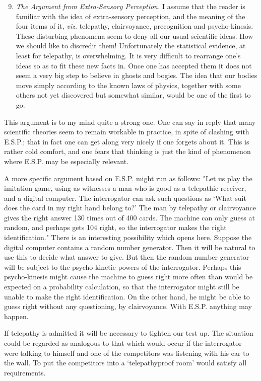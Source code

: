     \begin{enumerate}[label=(\arabic*)]
        \setcounter{enumi}{8}
        \item{\textit{The Argument from Extra-Sensory Perception.} I assume that the reader is familiar with the idea of extra-sensory perception, and the meaning of the four items of it, \textit{viz.} telepathy, clairvoyance, precognition and psycho-kinesis. These disturbing phenomena seem to deny all our usual scientific ideas. How we should like to discredit them! Unfortunately the statistical evidence, at least for telepathy, is overwhelming. It is very difficult to rearrange one's ideas so as to fit these new facts in. Once one has accepted them it does not seem a very big step to believe in ghosts and bogies. The idea that our bodies move simply according to the known laws of physics, together with some others not yet discovered but somewhat similar, would be one of the first to go.}
    \end{enumerate}

    This argument is to my mind quite a strong one. One can say in reply that many scientific theories seem to remain workable in practice, in spite of clashing with E.S.P.; that in fact one can get along very nicely if one forgets about it. This is rather cold comfort, and one fears that thinking is just the kind of phenomenon where E.S.P. may be especially relevant.
    
    A more specific argument based on E.S.P. might run as follows: "Let us play the imitation game, using as witnesses a man who is good as a telepathic receiver, and a digital computer. The interrogator can ask such questions as ‘What suit does the card in my right hand belong to?' The man by telepathy or clairvoyance gives the right answer 130 times out of 400 cards. The machine can only guess at random, and perhaps gets 104 right, so the interrogator makes the right identification." There is an interesting possibility which opens here. Suppose the digital computer contains a random number generator. Then it will be natural to use this to decide what answer to give. But then the random number generator will be subject to the psycho-kinetic powers of the interrogator. Perhaps this psycho-kinesis might cause the machine to guess right more often than would be expected on a probability calculation, so that the interrogator might still be unable to make the right identification. On the other hand, he might be able to guess right without any questioning, by clairvoyance. With E.S.P. anything may happen.

    If telepathy is admitted it will be necessary to tighten our test up. The situation could be regarded as analogous to that which would occur if the interrogator were talking to himself and one of the competitors was listening with his ear to the wall. To put the competitors into a ‘telepathyproof room' would satisfy all requirements.